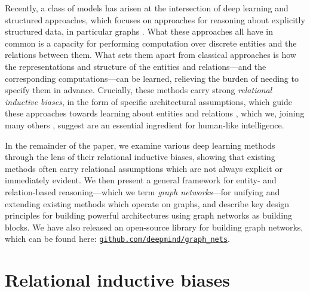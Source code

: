 Recently, a class of models has arisen at the intersection of deep learning and structured approaches, which focuses on approaches for reasoning about explicitly structured data, in particular graphs \citep[e.g.][]{scarselli2009graph,bronstein2017geometric,gilmer2017neural,wang2017non,li2018deep,kipf2018neural,gulcehre2018hyperbolic}.
What these approaches all have in common is a capacity for performing computation over discrete entities and the relations between them. What sets them apart from classical approaches is how the representations and structure of the entities and relations---and the corresponding computations---can be learned, 
relieving the burden of needing to specify them in advance.
Crucially, these methods carry strong \emph{relational inductive biases}, in the form of specific architectural assumptions, which guide these approaches towards learning about entities and relations \citep{mitchell1980need}, which we, joining many others  \citep{spelke1992origins,spelke2007core,marcus2001algebraic,tenenbaum2011grow,lake2017building,lake2018still,marcus2018innateness}, suggest are an essential ingredient for human-like intelligence.

In the remainder of the paper, we examine various deep learning methods through the lens of their relational inductive biases, showing that existing methods often carry relational assumptions which are not always explicit or immediately evident.
We then present a general framework for entity- and relation-based reasoning---which we term \emph{graph networks}---for unifying and extending existing methods which operate on graphs, and describe key design principles for building powerful architectures using graph networks as building blocks. We have also released an open-source library for building graph networks, which can be found here: \href{https://github.com/deepmind/graph_nets}{\texttt{{github.com/deepmind/graph\_nets}}}. 

\section{Relational inductive biases}
\label{sec:relinductivebias}

